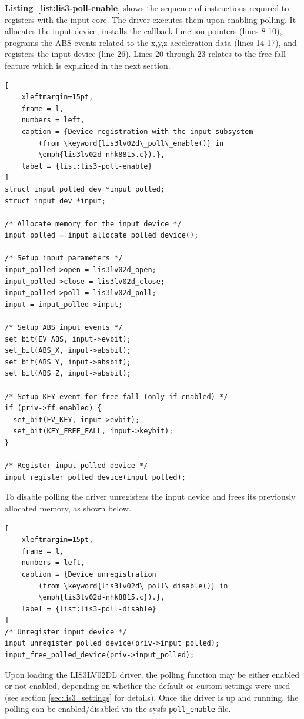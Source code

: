 \documentclass[a4paper,10pt]{article}
\newcommand{\keyword}[1]{\texttt{#1}}
\newcommand{\refl}[1]{\textbf{Listing~\ref{#1}}}
\begin{document}
\begin{multicols}{2}
\refl{list:lis3-poll-enable} shows the sequence of instructions required to
registers with the input core. The driver executes them upon enabling polling.
It allocates the input device, installs the callback function pointers (lines
8-10), programs the ABS events related to the x,y,z
acceleration data (lines 14-17), and registers the input device (line 26).
Lines 20 through 23 relates to the free-fall feature which is explained in
the next section.

\begin{lstlisting}[
	xleftmargin=15pt,
	frame = l,
	numbers = left,
	caption = {Device registration with the input subsystem
		(from \keyword{lis3lv02d\_poll\_enable()} in
		\emph{lis3lv02d-nhk8815.c}).},
	label = {list:lis3-poll-enable}
]
struct input_polled_dev *input_polled;
struct input_dev *input;

/* Allocate memory for the input device */
input_polled = input_allocate_polled_device();

/* Setup input parameters */
input_polled->open = lis3lv02d_open;
input_polled->close = lis3lv02d_close;
input_polled->poll = lis3lv02d_poll;
input = input_polled->input;

/* Setup ABS input events */
set_bit(EV_ABS, input->evbit);
set_bit(ABS_X, input->absbit);
set_bit(ABS_Y, input->absbit);
set_bit(ABS_Z, input->absbit);

/* Setup KEY event for free-fall (only if enabled) */
if (priv->ff_enabled) {
  set_bit(EV_KEY, input->evbit);
  set_bit(KEY_FREE_FALL, input->keybit);
}

/* Register input polled device */
input_register_polled_device(input_polled);
\end{lstlisting}

To disable polling the driver unregisters the input device and frees its
previously allocated memory, as shown below.

\begin{lstlisting}[
	xleftmargin=15pt,
	frame = l,
	numbers = left,
	caption = {Device unregistration
		(from \keyword{lis3lv02d\_poll\_disable()} in 
		\emph{lis3lv02d-nhk8815.c}).},
	label = {list:lis3-poll-disable}
]
/* Unregister input device */
input_unregister_polled_device(priv->input_polled);
input_free_polled_device(priv->input_polled);
\end{lstlisting}

Upon loading the LIS3LV02DL driver, the polling function may be either enabled
or not enabled, depending on whether the default or custom settings were used
(see section \ref{sec:lis3_settings} for details).
Once the driver is up and running, the polling can be enabled/disabled via the
sysfs \keyword{poll\_enable} file.



\end{multicols}
\end{document}
